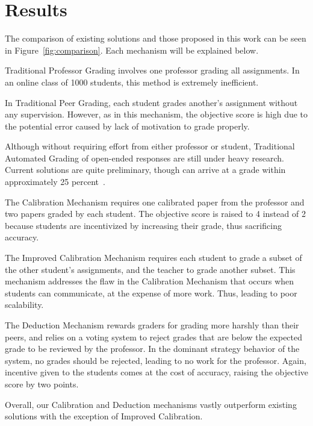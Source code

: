 \documentclass{chi-ext}
\begin{document}
\section{Results}
The comparison of existing solutions and those proposed in this work can be seen in Figure~\ref{fig:comparison}. Each mechanism will be explained below.

Traditional Professor Grading involves one professor grading all assignments. In an online class of 1000 students, this method is extremely inefficient.

In Traditional Peer Grading, each student grades another's assignment without any supervision. However, as in this mechanism, the objective score is high due to the potential error caused by lack of motivation to grade properly.

Although without requiring effort from either professor or student, Traditional Automated Grading of open-ended responses are still under heavy research. Current solutions are quite preliminary, though can arrive at a grade within approximately 25 percent~\cite{automatedsystemssuck}.

The Calibration Mechanism requires one calibrated paper from the professor and two papers graded by each student. The objective score is raised to 4 instead of 2 because students are incentivized by increasing their grade, thus sacrificing accuracy.

The Improved Calibration Mechanism requires each student to grade a subset of the other student's assignments, and the teacher to grade another subset. This mechanism addresses the flaw in the Calibration Mechanism that occurs when students can communicate, at the expense of more work. Thus, leading to poor scalability.

The Deduction Mechanism rewards graders for grading more harshly than their peers, and relies on a voting system to reject grades that are below the expected grade to be reviewed by the professor. In the dominant strategy behavior of the system, no grades should be rejected, leading to no work for the professor. Again, incentive given to the students comes at the cost of accuracy, raising the objective score by two points.

Overall, our Calibration and Deduction mechanisms vastly outperform existing solutions with the exception of Improved Calibration.
\end{document}
